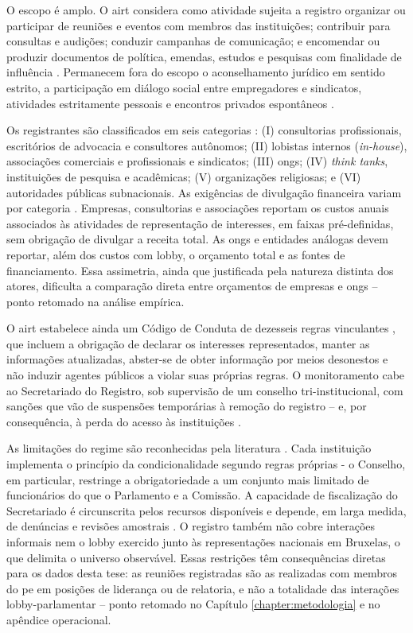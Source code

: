 O escopo é amplo. O \acrshort{airt} considera como atividade sujeita a registro organizar ou participar de reuniões e eventos com membros das instituições; contribuir para consultas e audições; conduzir campanhas de comunicação; e encomendar ou produzir documentos de política, emendas, estudos e pesquisas com finalidade de influência \cite[art.~3]{airt2021}. Permanecem fora do escopo o aconselhamento jurídico em sentido estrito, a participação em diálogo social entre empregadores e sindicatos, atividades estritamente pessoais e encontros privados espontâneos \cite[art.~4]{airt2021}.

Os registrantes são classificados em seis categorias \cite[Anexo~I]{airt2021}: (I) consultorias profissionais, escritórios de advocacia e consultores autônomos; (II) lobistas internos (\textit{in-house}), associações comerciais e profissionais e sindicatos; (III) \acrshort{ong}s; (IV) \textit{think tanks}, instituições de pesquisa e acadêmicas; (V) organizações religiosas; e (VI) autoridades públicas subnacionais. As exigências de divulgação financeira variam por categoria \cite[Anexo~II]{airt2021}. Empresas, consultorias e associações reportam os custos anuais associados às atividades de representação de interesses, em faixas pré-definidas, sem obrigação de divulgar a receita total. As \acrshort{ong}s e entidades análogas devem reportar, além dos custos com lobby, o orçamento total e as fontes de financiamento. Essa assimetria, ainda que justificada pela natureza distinta dos atores, dificulta a comparação direta entre orçamentos de empresas e \acrshort{ong}s -- ponto retomado na análise empírica.

O \acrshort{airt} estabelece ainda um Código de Conduta de dezesseis regras vinculantes \cite[Anexo~I]{airt2021}, que incluem a obrigação de declarar os interesses representados, manter as informações atualizadas, abster-se de obter informação por meios desonestos e não induzir agentes públicos a violar suas próprias regras. O monitoramento cabe ao Secretariado do Registro, sob supervisão de um conselho tri-institucional, com sanções que vão de suspensões temporárias à remoção do registro -- e, por consequência, à perda do acesso às instituições \cite[Anexo~III]{airt2021}.

As limitações do regime são reconhecidas pela literatura \cite{bunea2019regulating, ridao2025lobbying}. Cada instituição implementa o princípio da condicionalidade segundo regras próprias \cite{eprs2023register} - o Conselho, em particular, restringe a obrigatoriedade a um conjunto mais limitado de funcionários do que o Parlamento e a Comissão. A capacidade de fiscalização do Secretariado é circunscrita pelos recursos disponíveis e depende, em larga medida, de denúncias e revisões amostrais \cite{ridao2025lobbying}. O registro também não cobre interações informais nem o lobby exercido junto às representações nacionais em Bruxelas, o que delimita o universo observável. Essas restrições têm consequências diretas para os dados desta tese: as reuniões registradas são as realizadas com membros do \acrshort{pe} em posições de liderança ou de relatoria, e não a totalidade das interações lobby-parlamentar -- ponto retomado no Capítulo \ref{chapter:metodologia} e no apêndice operacional.


